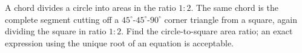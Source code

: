 A chord divides a circle into areas in the ratio $1:2$. The same chord is the complete segment cutting off a $45^\circ$-$45^\circ$-$90^\circ$ corner triangle from a square, again dividing the square in ratio $1:2$. Find the circle-to-square area ratio; an exact expression using the unique root of an equation is acceptable.
